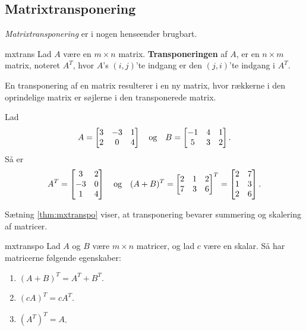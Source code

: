 \subsection{Matrixtransponering}
%
\textit{Matrixtransponering} er i nogen henseender brugbart. 
%
%
%
\begin{defn}{}{mxtrans}
Lad $A$ være en $m \times n$ matrix. \textbf{Transponeringen} af $A$, er en $n \times m$ matrix, noteret $A^T$, hvor $A$'s $(i,j)$'te indgang er den $(j,i)$'te indgang i $A^T$.
\end{defn}
\noindent
%
En transponering af en matrix resulterer i en ny matrix, hvor rækkerne i den oprindelige matrix er søjlerne i den transponerede matrix.
\\
%
\begin{eks}
\label{eks:trans}
%
Lad 
%
\begin{align*}
A= 
\begin{bmatrix}
3	&	-3	&	1 \\
2	&	0	&	4
\end{bmatrix}
\text{\phantom{---}og\phantom{---}}
B= 
\begin{bmatrix}
-1	&	4	&	1\\
5	&	3	&	2
\end{bmatrix}.
\end{align*}
%
Så er
%
\begin{align*}
A^T =
\begin{bmatrix}
3	&	2\\
-3	&	0\\
1	&	4
\end{bmatrix}
\text{\phantom{---}og\phantom{---}}
(A+B)^T=
\begin{bmatrix}
2	&	1	&	2\\
7	&	3	&	6
\end{bmatrix}^T
=
\begin{bmatrix}
2	&	7\\
1	&	3\\
2	&	6
\end{bmatrix}.
\end{align*}
%
\end{eks}
%
%
Sætning \ref{thm:mxtranspo} viser, at transponering bevarer summering og skalering af matricer.
%
\begin{thm}{}{mxtranspo}
Lad $A$ og $B$ være $m \times n$ matricer, og lad $c$ være en skalar.
Så har matricerne følgende egenskaber:
\begin{enumerate}[label=(\alph*)]
\item $(A + B)^T = A^T + B^T$.
\item $(cA)^T = cA^T$.
\item $(A^T)^T = A$.
\end{enumerate}
\end{thm}
